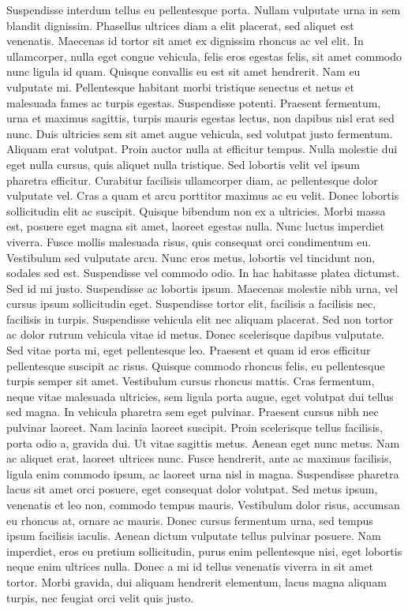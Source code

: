 \documentclass[a4paper,11pt,twoside]{book}
\begin{document}
Suspendisse interdum tellus eu pellentesque porta. Nullam vulputate urna in sem blandit dignissim. Phasellus ultrices diam a elit placerat, sed aliquet est venenatis. Maecenas id tortor sit amet ex dignissim rhoncus ac vel elit. In ullamcorper, nulla eget congue vehicula, felis eros egestas felis, sit amet commodo nunc ligula id quam. Quisque convallis eu est sit amet hendrerit. Nam eu vulputate mi. Pellentesque habitant morbi tristique senectus et netus et malesuada fames ac turpis egestas. Suspendisse potenti. Praesent fermentum, urna et maximus sagittis, turpis mauris egestas lectus, non dapibus nisl erat sed nunc. Duis ultricies sem sit amet augue vehicula, sed volutpat justo fermentum.
Aliquam erat volutpat. Proin auctor nulla at efficitur tempus. Nulla molestie dui eget nulla cursus, quis aliquet nulla tristique. Sed lobortis velit vel ipsum pharetra efficitur. Curabitur facilisis ullamcorper diam, ac pellentesque dolor vulputate vel. Cras a quam et arcu porttitor maximus ac eu velit. Donec lobortis sollicitudin elit ac suscipit. Quisque bibendum non ex a ultricies.
Morbi massa est, posuere eget magna sit amet, laoreet egestas nulla. Nunc luctus imperdiet viverra. Fusce mollis malesuada risus, quis consequat orci condimentum eu. Vestibulum sed vulputate arcu. Nunc eros metus, lobortis vel tincidunt non, sodales sed est. Suspendisse vel commodo odio. In hac habitasse platea dictumst. Sed id mi justo. Suspendisse ac lobortis ipsum. Maecenas molestie nibh urna, vel cursus ipsum sollicitudin eget.
Suspendisse tortor elit, facilisis a facilisis nec, facilisis in turpis. Suspendisse vehicula elit nec aliquam placerat. Sed non tortor ac dolor rutrum vehicula vitae id metus. Donec scelerisque dapibus vulputate. Sed vitae porta mi, eget pellentesque leo. Praesent et quam id eros efficitur pellentesque suscipit ac risus. Quisque commodo rhoncus felis, eu pellentesque turpis semper sit amet. Vestibulum cursus rhoncus mattis. Cras fermentum, neque vitae malesuada ultricies, sem ligula porta augue, eget volutpat dui tellus sed magna. In vehicula pharetra sem eget pulvinar. Praesent cursus nibh nec pulvinar laoreet. Nam lacinia laoreet suscipit. Proin scelerisque tellus facilisis, porta odio a, gravida dui. Ut vitae sagittis metus.
Aenean eget nunc metus. Nam ac aliquet erat, laoreet ultrices nunc. Fusce hendrerit, ante ac maximus facilisis, ligula enim commodo ipsum, ac laoreet urna nisl in magna. Suspendisse pharetra lacus sit amet orci posuere, eget consequat dolor volutpat. Sed metus ipsum, venenatis et leo non, commodo tempus mauris. Vestibulum dolor risus, accumsan eu rhoncus at, ornare ac mauris. Donec cursus fermentum urna, sed tempus ipsum facilisis iaculis. Aenean dictum vulputate tellus pulvinar posuere. Nam imperdiet, eros eu pretium sollicitudin, purus enim pellentesque nisi, eget lobortis neque enim ultrices nulla. Donec a mi id tellus venenatis viverra in sit amet tortor. Morbi gravida, dui aliquam hendrerit elementum, lacus magna aliquam turpis, nec feugiat orci velit quis justo.
\end{document}
